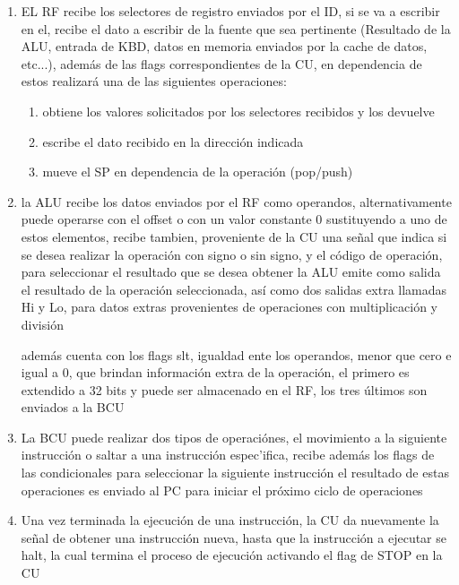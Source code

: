 \documentclass{article}
\begin{document}
\begin{enumerate}
            \item EL RF recibe los selectores de registro enviados por el ID, si se va a escribir en el, recibe el dato a escribir de la fuente que sea pertinente (Resultado de la ALU, entrada de KBD, datos en memoria enviados por la cache de datos, etc...), adem\'as de las flags correspondientes de la CU, en dependencia de estos realizar\'a una de las siguientes operaciones:
            \begin{enumerate}
                \item obtiene los valores solicitados por los selectores recibidos y los devuelve
                \item escribe el dato recibido en la direcci\'on indicada 
                \item mueve el SP en dependencia de la operaci\'on (pop/push)
            \end{enumerate}

            \item la ALU recibe los datos enviados por el RF como operandos, alternativamente puede operarse con el offset o con un valor constante 0 sustituyendo a uno de estos elementos,
            recibe tambien, proveniente de la CU una se\~nal que indica si se desea realizar la operaci\'on con signo o sin signo, y el c\'odigo de operaci\'on, para seleccionar el resultado que se desea obtener
            la ALU emite como salida el resultado de la operaci\'on seleccionada, as\'i como dos salidas extra llamadas Hi y Lo, para datos extras provenientes de operaciones con multiplicaci\'on y divisi\'on
            
            adem\'as cuenta con los flags slt, igualdad ente los operandos, menor que cero e igual a 0, que brindan informaci\'on extra de la operaci\'on, el primero es extendido a 32 bits y puede ser almacenado en el RF, los tres \'ultimos son enviados a la BCU
            
            \item La BCU puede realizar dos tipos de operaci\'ones, el movimiento a la siguiente instrucci\'on o saltar a una instrucci\'on espec'ifica, recibe adem\'as los flags de las condicionales para seleccionar la siguiente instrucci\'on
            el resultado de estas operaciones es enviado al PC para iniciar el pr\'oximo ciclo de operaciones

            \item Una vez terminada la ejecuci\'on de una instrucci\'on, la CU da nuevamente la se\~nal de obtener una instrucci\'on nueva, hasta que la instrucci\'on a ejecutar se halt, la cual termina el proceso de ejecuci\'on activando el flag de STOP en la CU
            

        \end{enumerate}
            
\end{document}
